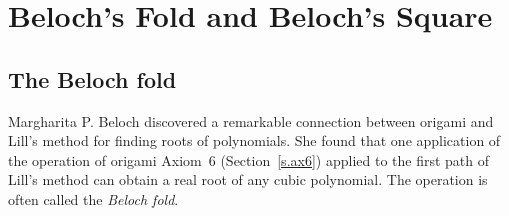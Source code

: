
\chapter{Beloch's Fold and Beloch's Square}\label{c.beloch}

\section{The Beloch fold}\label{s.beloch-fold}

Margharita P. Beloch discovered a remarkable connection between origami and Lill's method for finding roots of polynomials. She found that one application of the operation of origami Axiom~6 (Section~\ref{s.ax6}) applied to the first path of Lill's method can obtain a real root of any cubic polynomial. The operation is often called the \emph{Beloch fold}.

